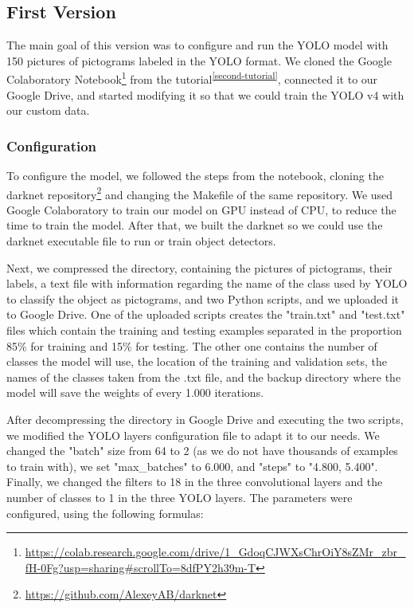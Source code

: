 \subsection{First Version}
\label{First Iteration of YOLO}

The main goal of this version was to configure and run the YOLO model with 150 pictures of pictograms labeled in the YOLO format. We cloned the Google Colaboratory Notebook\footnote{\href{https://colab.research.google.com/drive/1_GdoqCJWXsChrOiY8sZMr_zbr_fH-0Fg?usp=sharing#scrollTo=8dfPY2h39m-T}{https://colab.research.google.com/drive/1\_GdoqCJWXsChrOiY8sZMr\_zbr\_fH-0Fg?usp=sharing#scrollTo=8dfPY2h39m-T}} from the tutorial\textsuperscript{\ref{second-tutorial}}, connected it to our Google Drive, and started modifying it so that we could train the YOLO v4 with our custom data.

\subsubsection{Configuration}

To configure the model, we followed the steps from the notebook, cloning the darknet repository\footnote{\href{https://github.com/AlexeyAB/darknet}{https://github.com/AlexeyAB/darknet}} and changing the Makefile of the same repository. We used Google Colaboratory to train our model on GPU instead of CPU, to reduce the time to train the model. After that, we built the darknet so we could use the darknet executable file to run or train object detectors.

Next, we compressed the directory, containing the pictures of pictograms, their labels, a text file with information regarding the name of the class used by YOLO to classify the object as pictograms, and two Python scripts, and we uploaded it to Google Drive. One of the uploaded scripts creates the "train.txt" and "test.txt" files which contain the training and testing examples separated in the proportion 85\% for training and 15\% for testing. The other one contains the number of classes the model will use, the location of the training and validation sets, the names of the classes taken from the .txt file, and the backup directory where the model will save the weights of every 1.000 iterations.

After decompressing the directory in Google Drive and executing the two scripts, we modified the YOLO layers configuration file to adapt it to our needs. We changed the "batch" size from 64 to 2 (as we do not have thousands of examples to train with), we set "max\_batches" to 6.000, and "steps" to "4.800, 5.400". Finally, we changed the filters to 18 in the three convolutional layers and the number of classes to 1 in the three YOLO layers. The parameters were configured, using the following formulas:\hfill \break

